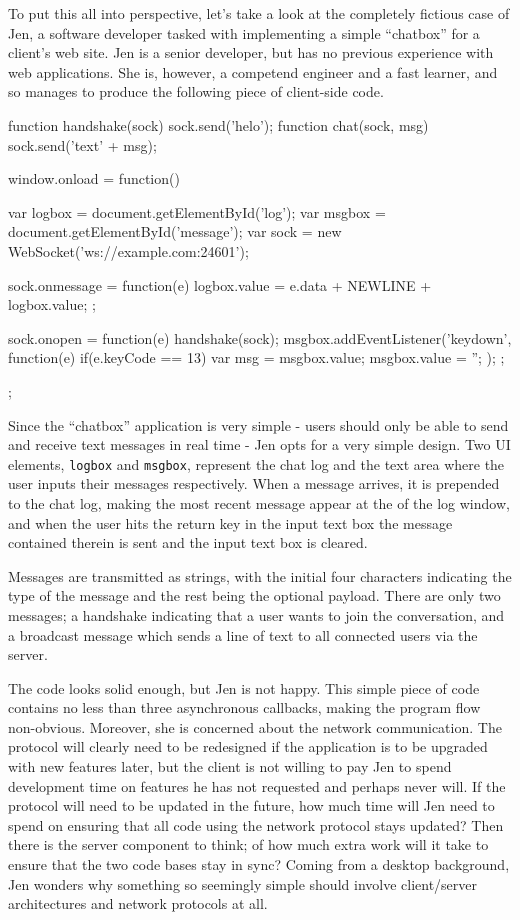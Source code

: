 \documentclass[preprint]{sigplanconf}
\begin{document}
To put this all into perspective, let's take a look at the completely fictious
case of Jen, a software developer tasked with implementing a simple ``chatbox''
for a client's web site. Jen is a senior developer, but has no previous
experience with web applications. She is, however, a competend engineer and a
fast learner, and so manages to produce the following piece of client-side code.

\begin{code}
function handshake(sock) {sock.send('helo');}
function chat(sock, msg) {sock.send('text' + msg);}

window.onload = function() {
    var logbox = document.getElementById('log');
    var msgbox = document.getElementById('message');
    var sock = new WebSocket('ws://example.com:24601');

    sock.onmessage = function(e) {
        logbox.value = e.data + NEWLINE + logbox.value;
    };

    sock.onopen = function(e) {
        handshake(sock);
        msgbox.addEventListener('keydown', function(e) {
            if(e.keyCode == 13) {
                var msg = msgbox.value;
                msgbox.value = '';
            }
        });
    };
};
\end{code}

Since the ``chatbox'' application is very simple - users should only be able to
send and receive text messages in real time - Jen opts for a very simple
design. Two UI elements, \lstinline!logbox! and \lstinline!msgbox!, represent
the chat log and the text area where the user inputs their messages
respectively. When a message arrives, it is prepended to the chat log, making
the most recent message appear at the of the log window, and when the user hits
the return key in the input text box the message contained therein is sent and
the input text box is cleared.

Messages are transmitted as strings, with the initial four characters
indicating the type of the message and the rest being the optional payload.
There are only two messages; a handshake indicating that a user wants to join
the conversation, and a broadcast message which sends a line of text to all
connected users via the server.

The code looks solid enough, but Jen is not happy. This simple piece of code
contains no less than three asynchronous callbacks, making the program flow
non-obvious. Moreover, she is concerned about the network communication. The
protocol will clearly need to be redesigned if the application is to be
upgraded with new features later, but the client is not willing to pay Jen to
spend development time on features he has not requested and perhaps never will.
If the protocol will need to be updated in the future, how much time will Jen
need to spend on ensuring that all code using the network protocol stays
updated? Then there is the server component to think; of how much extra work
will it take to ensure that the two code bases stay in sync? Coming from a
desktop background, Jen wonders why something so seemingly simple should
involve client/server architectures and network protocols at all.
\end{document}
